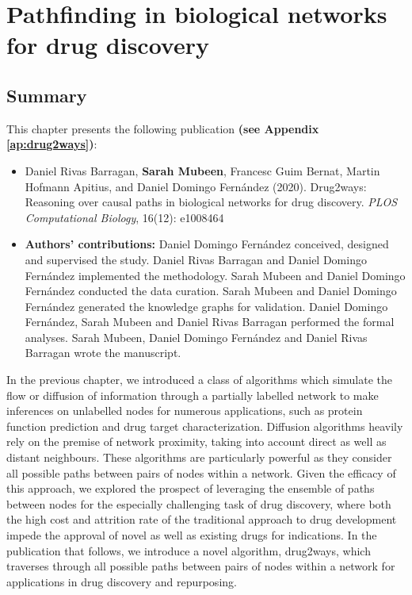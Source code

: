 \chapter{Pathfinding in biological networks for drug discovery}

\label{ch:drug2ways}

\section*{Summary}

This chapter presents the following publication \textbf{(see Appendix \ref{ap:drug2ways})}:

\begin{itemize}

\item[] Daniel Rivas Barragan, \textbf{Sarah Mubeen}, Francesc Guim Bernat, Martin Hofmann Apitius, and Daniel Domingo Fernández (2020). Drug2ways: Reasoning over causal paths in biological networks for drug discovery. \textit{PLOS Computational Biology}, 16(12): e1008464

\item[] \textbf{Authors' contributions:} Daniel Domingo Fernández conceived, designed and supervised the study. Daniel Rivas Barragan and Daniel Domingo Fernández implemented the methodology. Sarah Mubeen and Daniel Domingo Fernández conducted the data curation. Sarah Mubeen and Daniel Domingo Fernández generated the knowledge graphs for validation. Daniel Domingo Fernández, Sarah Mubeen and Daniel Rivas Barragan performed the formal analyses. Sarah Mubeen, Daniel Domingo Fernández and Daniel Rivas Barragan wrote the manuscript.

\end{itemize}

\noindent
In the previous chapter, we introduced a class of algorithms which simulate the flow or diffusion of information through a partially labelled network to make inferences on unlabelled nodes for numerous applications, such as protein function prediction and drug target characterization. Diffusion algorithms heavily rely on the premise of network proximity, taking into account direct as well as distant neighbours. These algorithms are particularly powerful as they consider all possible paths between pairs of nodes within a network. Given the efficacy of this approach, we explored the prospect of leveraging the ensemble of paths between nodes for the especially challenging task of drug discovery, where both the high cost and attrition rate of the traditional approach to drug development impede the approval of novel as well as existing drugs for indications. In the publication that follows, we introduce a novel algorithm, drug2ways, which traverses through all possible paths between pairs of nodes within a network for applications in drug discovery and repurposing.


